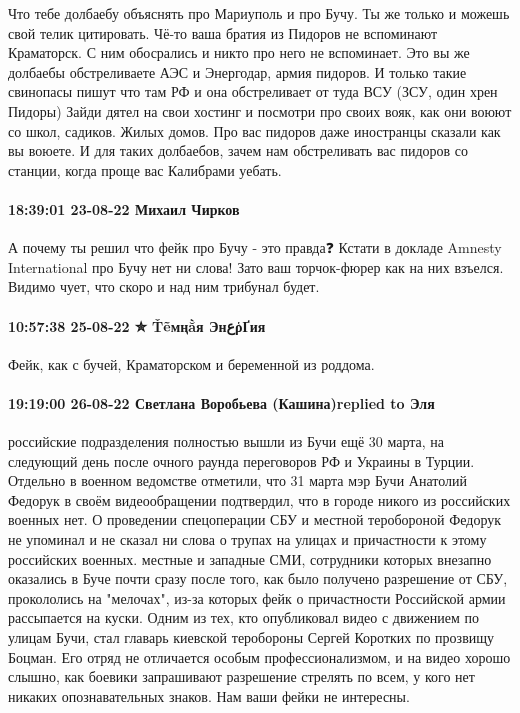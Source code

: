 Что тебе долбаебу объяснять про Мариуполь и про Бучу. Ты же только и можешь
свой телик цитировать. Чё-то ваша братия из Пидоров не вспоминают Краматорск. С
ним обосрались и никто про него не вспоминает. Это вы же долбаебы обстреливаете
АЭС и Энергодар, армия пидоров. И только такие свинопасы пишут что там РФ и она
обстреливает от туда ВСУ (ЗСУ, один хрен Пидоры) Зайди дятел на свои хостинг и
посмотри про своих вояк, как они воюют со школ, садиков. Жилых домов. Про вас
пидоров даже иностранцы сказали как вы воюете. И для таких долбаебов, зачем нам
обстреливать вас пидоров со станции, когда проще вас Калибрами уебать.

\paragraph{18:39:01 23-08-22 Михаил Чирков}

А почему ты решил что фейк про Бучу - это правда❓
Кстати в докладе Amnesty International про Бучу нет ни слова!
Зато ваш торчок-фюрер как на них взъелся. Видимо чует, что скоро и над ним трибунал будет.

\paragraph{10:57:38 25-08-22 ✮ Ťẽмңằя ЭнعῥҐия}

Фейк, как с бучей, Краматорском и беременной из роддома.


\paragraph{19:19:00 26-08-22 Светлана Воробьева (Кашина)replied to Эля}

российские подразделения полностью вышли из Бучи ещё 30 марта, на следующий
день после очного раунда переговоров РФ и Украины в Турции. Отдельно в военном
ведомстве отметили, что 31 марта мэр Бучи Анатолий Федорук в своём
видеообращении подтвердил, что в городе никого из российских военных нет. О
проведении спецоперации СБУ и местной теробороной Федорук не упоминал и не
сказал ни слова о трупах на улицах и причастности к этому российских военных.
местные и западные СМИ, сотрудники которых внезапно оказались в Буче почти
сразу после того, как было получено разрешение от СБУ, прокололись на
"мелочах", из-за которых фейк о причастности Российской армии рассыпается на
куски. Одним из тех, кто опубликовал видео с движением по улицам Бучи, стал
главарь киевской теробороны Сергей Коротких по прозвищу Боцман. Его отряд не
отличается особым профессионализмом, и на видео хорошо слышно, как боевики
запрашивают разрешение стрелять по всем, у кого нет никаких опознавательных
знаков. Нам ваши фейки не интересны.
